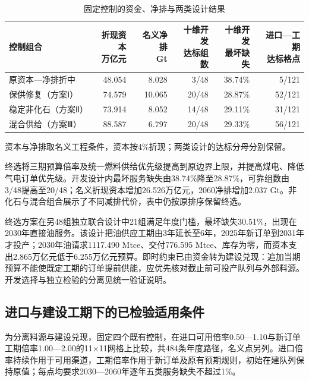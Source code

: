 \begin{table}[H]\centering\caption{固定控制的资金、净排与两类设计结果}
\begin{tabular}{lrrrrr}\toprule
控制组合 & \shortstack{折现资本\\万亿元} & \shortstack{名义净排\\Gt} & \shortstack{十维开发\\达标组数} & \shortstack{十维开发\\最坏缺失} & \shortstack{进口—工期\\达标格点}\\\midrule
原资本—净排折中 & 48.054 & 8.028 & 3/48 & 38.74\% & 5/121 \\
保供修复（方案Ⅰ） & 74.579 & 10.065 & 20/48 & 28.87\% & 52/121 \\
稳定非化石（方案Ⅱ） & 73.914 & 8.052 & 14/48 & 29.11\% & 31/121 \\
混合供给（方案Ⅲ） & 88.587 & 6.797 & 20/48 & 29.33\% & 56/121 \\
\bottomrule\end{tabular}

\smallskip\noindent 资本与净排取名义工程条件，资本按4\%折现；两类设计的达标分母分别保留。
\end{table}
\par

终选将三期预算倍率及统一燃料供给优先级提高到原边界上限，并提高煤电、降低气电订单优先级。开发设计内最坏服务缺失由38.74\%降至28.87\%，可靠组数由3/48提高至20/48；名义折现资本增加26.526万亿元，2060净排增加2.037 Gt。非化石与混合组合展示了不同减排代价，表中仍按原排序保留终选。

终选方案在另48组独立联合设计中21组满足年度门槛，最坏缺失30.51\%，出现在2030年直接油服务。该设计把油供应工期由3年延长至6年，2025年新订单到2031年才投产；2030年油请求1117.490 Mtce、交付776.595 Mtce、库存为零，而资本支出2.865万亿元低于6.255万亿元预算。即时约束已由资金转为建设兑现：追加当期预算不能使既定工期的订单提前供能，应优先核对截止前可投产队列与外部料源。开发选择与独立检验的分离见统一验证说明。

\subsection{进口与建设工期下的已检验适用条件}
为分离料源与建设兑现，固定四个既有控制，在进口可用倍率0.50—1.10与新订单工期倍率1.00—2.00的11$\times$11网格上比较，共484条年度路径，名义点另列。进口倍率持续作用于可用渠道，工期倍率作用于新订单及原有预期规则，初始在建队列保持原值；每点均要求2030—2060年逐年五类服务缺失不超过1\%。

